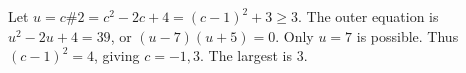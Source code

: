 Let $u=c\#2=c^2-2c+4=(c-1)^2+3\ge3$. The outer equation is $u^2-2u+4=39$, or $(u-7)(u+5)=0$. Only $u=7$ is possible. Thus $(c-1)^2=4$, giving $c=-1,3$. The largest is $\boxed3$.
